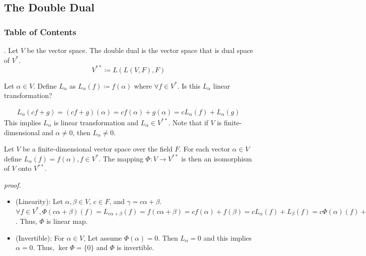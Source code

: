 \documentclass[8pt]{beamer}
\newcommand{\ti}[1]{\textit{#1}}
\begin{document}
\subsection{The Double Dual}

\begingroup
    \begin{frame}
        \frametitle{Table of Contents}
        \tableofcontents[currentsubsection]
    \end{frame}
\endgroup

\begin{frame}{.}
    Let $V$ be the vector space.
    The double dual is the vector space that is dual space of $V^\ast$.
    \[
    V^{\ast \ast} \coloneq L(L(V, F), F)
    \]

    Let $\alpha \in V$.
    Define $L_{\alpha}$ as $L_{\alpha}(f) \coloneq f(\alpha)$ where $\forall f \in V^\ast$.
    Is this $L_{\alpha}$ linear transformation?

    \[
        \begin{aligned}
            L_{\alpha} (cf + g) = (cf+g)(\alpha) = cf(\alpha) + g(\alpha) = c L_{\alpha}(f) + L_{\alpha}(g)
        \end{aligned}
    \]
    This implies $L_{\alpha}$ is linear transformation and $L_{\alpha} \in V^{\ast\ast}$.
    Note that if $V$ is finite-dimensional and $\alpha \neq 0$, then $L_{\alpha} \neq 0$.

    \begin{theorem} \label{th:7}
        Let $V$ be a finite-dimensional vector space over the field $F$.
        For each vector $\alpha \in V$ define $L_{\alpha} (f) =f(\alpha), f \in V^\ast$.
        The mapping $\Phi : V \to V^{\ast\ast}$ is then an isomorphism of $V$ onto $V^{\ast\ast}$.
    \end{theorem}
    \ti{proof.}

    \begin{itemize}
        \item (Linearity):
        Let $\alpha, \beta \in V$, $c \in F$, and $\gamma = c\alpha + \beta$.
        $\forall f \in V^\ast, \Phi(c \alpha + \beta)(f) = L_{c \alpha + \beta}(f) = f(c \alpha + \beta) = cf(\alpha) + f(\beta) = c L_{\alpha}(f) + L_{\beta}(f) = c\Phi(\alpha)(f) + \Phi(\beta)(f)$.
        Thus, $\Phi$ is linear map.
        \item (Invertible): For $\alpha \in V$, Let assume $\Phi(\alpha) = 0$.
        Then $L_{\alpha} = 0$ and this implies $\alpha = 0$.
        Thus, $\ker \Phi =\{0\}$ and $\Phi$ is invertible.
    \end{itemize}
\end{frame}
\end{document}
